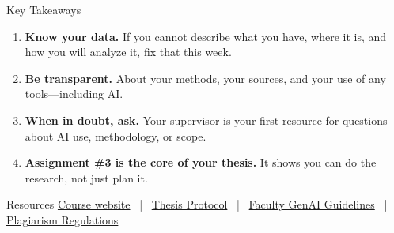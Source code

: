 \documentclass[aspectratio=169,11pt]{beamer}
\begin{document}
\begin{frame}{Key Takeaways}
    \begin{enumerate}
        \item \textbf{Know your data.} If you cannot describe what you have, where it is, and how you will analyze it, fix that this week.
        \vspace{0.2cm}
        \item \textbf{Be transparent.} About your methods, your sources, and your use of any tools---including AI.
        \vspace{0.2cm}
        \item \textbf{When in doubt, ask.} Your supervisor is your first resource for questions about AI use, methodology, or scope.
        \vspace{0.2cm}
        \item \textbf{Assignment \#3 is the core of your thesis.} It shows you can do the research, not just plan it.
    \end{enumerate}
    \vspace{0.5cm}
    \begin{block}{Resources}
        \footnotesize
        \textcolor{SlateBlue}{\href{https://scdenney.github.io/baks_thesis-seminar/}{Course website}} ~|~
        \textcolor{SlateBlue}{\href{https://scdenney.github.io/baks_thesis-seminar/protocol/}{Thesis Protocol}} ~|~
        \textcolor{SlateBlue}{\href{https://www.organisatiegids.universiteitleiden.nl/en/regulations/humanities/guidelines-for-the-use-of-genai-in-assessment}{Faculty GenAI Guidelines}} ~|~
        \textcolor{SlateBlue}{\href{https://www.organisatiegids.universiteitleiden.nl/en/regulations/general/plagiarism}{Plagiarism Regulations}}
    \end{block}
\end{frame}
\end{document}
